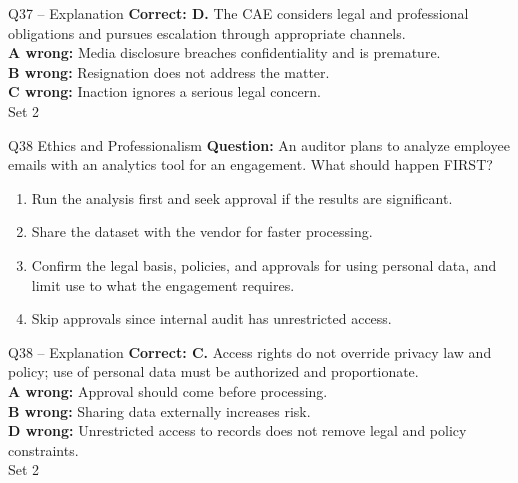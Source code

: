 \documentclass[aspectratio=169,10pt]{beamer}
\begin{document}
\begin{frame}[t]{Q37 -- Explanation}
	\footnotesize
	\textbf{Correct: D.} The CAE considers legal and professional obligations and pursues escalation through appropriate channels. \\[5pt]
\textbf{A wrong:} Media disclosure breaches confidentiality and is premature. \\[3pt]
\textbf{B wrong:} Resignation does not address the matter. \\[3pt]
\textbf{C wrong:} Inaction ignores a serious legal concern. \\[3pt]
	\vfill {\tiny Set 2}
\end{frame}

\begin{frame}[t]{Q38 \hfill {\scriptsize Ethics and Professionalism}}
	\small
	\textbf{Question:} An auditor plans to analyze employee emails with an analytics tool for an engagement. What should happen FIRST?
	\begin{enumerate}[label=\Alph*.,itemsep=1pt,topsep=3pt]
			\item Run the analysis first and seek approval if the results are significant.
			\item Share the dataset with the vendor for faster processing.
			\item Confirm the legal basis, policies, and approvals for using personal data, and limit use to what the engagement requires.
			\item Skip approvals since internal audit has unrestricted access.
	\end{enumerate}
\end{frame}

\begin{frame}[t]{Q38 -- Explanation}
	\footnotesize
	\textbf{Correct: C.} Access rights do not override privacy law and policy; use of personal data must be authorized and proportionate. \\[5pt]
\textbf{A wrong:} Approval should come before processing. \\[3pt]
\textbf{B wrong:} Sharing data externally increases risk. \\[3pt]
\textbf{D wrong:} Unrestricted access to records does not remove legal and policy constraints. \\[3pt]
	\vfill {\tiny Set 2}
\end{frame}
\end{document}
